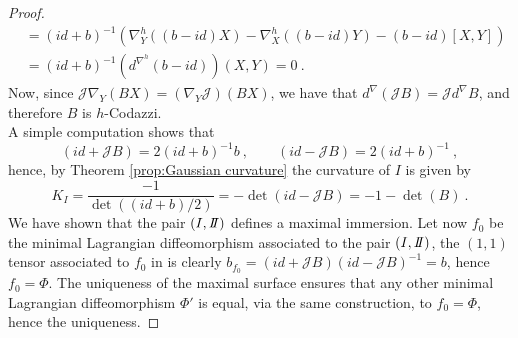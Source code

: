 \begin{proof}
\[\begin{split}
        & = (id + b)^{-1} (\nabla^h_Y ((b-id) X) -  \nabla^h_X ((b-id) Y) - (b-id) \left[ X,Y \right] ) \\
        & = (id + b)^{-1}(d^{\nabla^h}(b-id))(X,Y) = 0 \ .
    \end{split}
    \]
    Now, since $\mathcal{J}\nabla_Y(BX) = (\nabla_Y \mathcal{J})(BX)$, we have that $d^\nabla (\mathcal{J}B) = \mathcal{J} d^\nabla B$, and therefore $B$ is $h$-Codazzi.\\
    A simple computation shows that 
    \begin{equation}\label{eq:roba}
        (id+ \mathcal{J}B) = 2(id +b)^{-1} b  \ , \qquad (id- \mathcal{J}B) = 2(id +b)^{-1} \ ,
    \end{equation}
     hence, by Theorem \ref{prop:Gaussian curvature} the curvature of $I$ is given by
    \[
        K_I = \frac{-1}{\det((id+b)/2)} = -\det(id - \mathcal{J}B) = -1 - \det(B) \ .
    \]
    We have shown that the pair $(\I,\II)$ defines a maximal immersion.
    Let now $f_0$ be the minimal Lagrangian diffeomorphism associated to the pair $(I,\II)$, the $(1,1)$ tensor associated to $f_0$ in  is clearly $b_{f_0} = (id+\mathcal{J}B)(id-\mathcal{J}B)^{-1} = b$, hence $f_0 = \Phi$. The uniqueness of the maximal surface ensures that any other minimal Lagrangian diffeomorphism $\Phi'$ is equal, via the same construction, to $f_0=\Phi$, hence the uniqueness.
\end{proof}
